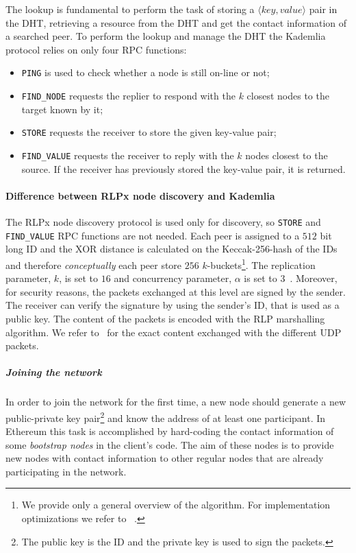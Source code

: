 The lookup is fundamental to perform the task of storing a $\langle key,
value\rangle$ pair in the DHT, retrieving a resource from the DHT and get
the contact information of a searched peer.
To perform the lookup and manage the DHT the Kademlia protocol relies on only 
four RPC functions:
\begin{itemize}
	\item \verb|PING| is used to check whether a node is still on-line
	or not;
	\item \verb|FIND_NODE| requests the replier to respond with the $k$ closest
	nodes to the target known by it;
	\item \verb|STORE| requests the receiver to store the given
	key-value pair;
	\item \verb|FIND_VALUE| requests the receiver to reply with the $k$
	nodes closest to the source. If the receiver has previously stored the
	key-value pair, it is returned.
\end{itemize}

\paragraph{Difference between RLPx node discovery and Kademlia}
The RLPx node discovery protocol is used only for discovery, so
\verb|STORE| and \verb|FIND_VALUE| RPC functions are not 
needed.
Each peer is assigned to a $512$ bit long ID and the XOR distance is calculated
on the Keccak-256-hash of the IDs and therefore
\emph{conceptually} each peer store $256$ $k$-buckets\footnote{
	We provide only a general overview of the algorithm. For implementation
	optimizations we refer to ~\cite{bib:kademlia}.}.
The replication parameter, $k$, is set to $16$ and concurrency parameter, $\alpha$ is set to $3$~\cite{bib:rlpx-discovery-protocol}.
Moreover, for security reasons, the packets exchanged at this level are signed
by the sender. The receiver can verify the signature by using the sender's ID, 
that is used as a public key.
The content of the packets is encoded with the RLP marshalling algorithm.
We refer to~\cite{bib:rlpx-discovery-protocol} for the exact content exchanged 
with the different UDP packets.





\subparagraph{Joining the network}
In order to join the network for the first time, a new node should generate a
new public-private key pair\footnote{The public key is the ID and the private
key is used to sign the packets.} and know the address of at least one
participant. In Ethereum this task is accomplished by hard-coding the contact
information of some \textit{bootstrap nodes} in the client's code. The aim of
these nodes is to provide new nodes with contact information to other regular
nodes that are already participating in the network.

